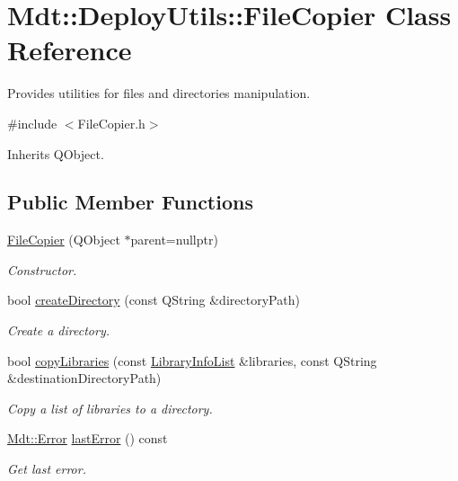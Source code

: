 \hypertarget{class_mdt_1_1_deploy_utils_1_1_file_copier}{}\section{Mdt\+:\+:Deploy\+Utils\+:\+:File\+Copier Class Reference}
\label{class_mdt_1_1_deploy_utils_1_1_file_copier}


Provides utilities for files and directories manipulation.  




{\ttfamily \#include $<$File\+Copier.\+h$>$}



Inherits Q\+Object.

\subsection*{Public Member Functions}
\begin{DoxyCompactItemize}
\item 
\hyperlink{class_mdt_1_1_deploy_utils_1_1_file_copier_af21c6f7e6fc3074e2fed28d127b29edf}{File\+Copier} (Q\+Object $\ast$parent=nullptr)\hypertarget{class_mdt_1_1_deploy_utils_1_1_file_copier_af21c6f7e6fc3074e2fed28d127b29edf}{}\label{class_mdt_1_1_deploy_utils_1_1_file_copier_af21c6f7e6fc3074e2fed28d127b29edf}

\begin{DoxyCompactList}\small\item\em Constructor. \end{DoxyCompactList}\item 
bool \hyperlink{class_mdt_1_1_deploy_utils_1_1_file_copier_ab1040ccbe34149841a42191e7ced3ba4}{create\+Directory} (const Q\+String \&directory\+Path)
\begin{DoxyCompactList}\small\item\em Create a directory. \end{DoxyCompactList}\item 
bool \hyperlink{class_mdt_1_1_deploy_utils_1_1_file_copier_ab81974d2e6e5b2260a8147c3400dcb3a}{copy\+Libraries} (const \hyperlink{class_mdt_1_1_deploy_utils_1_1_library_info_list}{Library\+Info\+List} \&libraries, const Q\+String \&destination\+Directory\+Path)
\begin{DoxyCompactList}\small\item\em Copy a list of libraries to a directory. \end{DoxyCompactList}\item 
\hyperlink{class_mdt_1_1_error}{Mdt\+::\+Error} \hyperlink{class_mdt_1_1_deploy_utils_1_1_file_copier_a8e82df0b666b0cdb45edd878af31893f}{last\+Error} () const \hypertarget{class_mdt_1_1_deploy_utils_1_1_file_copier_a8e82df0b666b0cdb45edd878af31893f}{}\label{class_mdt_1_1_deploy_utils_1_1_file_copier_a8e82df0b666b0cdb45edd878af31893f}

\begin{DoxyCompactList}\small\item\em Get last error. \end{DoxyCompactList}\end{DoxyCompactItemize}


